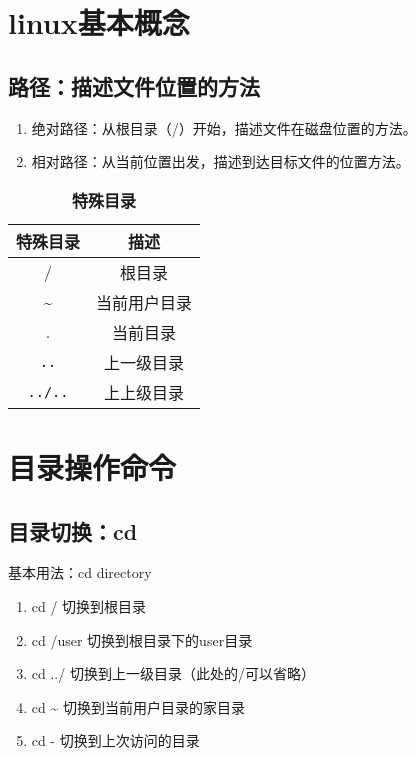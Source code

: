 \documentclass{notebook}
\begin{document}
\maketitle

\newpage
{}
\setcounter{page}{1}
\tableofcontents

\newpage
\setcounter{page}{1}

\chapter{linux基本概念}
\section{路径：描述文件位置的方法}
\begin{enumerate}
    \item 绝对路径：从根目录（/）开始，描述文件在磁盘位置的方法。
    \item 相对路径：从当前位置出发，描述到达目标文件的位置方法。
\end{enumerate}
\begin{table}[htb]
\centering
\caption{\textbf{特殊目录}}
\begin{tabular}{c|c}
\hline
\textbf{特殊目录}&\textbf{描述}\\ 
\hline
/&根目录\\
\~{}&当前用户目录\\
.&当前目录\\
\verb|..|&上一级目录\\
\verb|../..|&上上级目录\\
\hline
\end{tabular}
\end{table}

\chapter{目录操作命令}
\section{目录切换：cd}
基本用法：cd directory
\begin{enumerate}
    \item cd / 切换到根目录
    \item cd /user 切换到根目录下的user目录
    \item cd ../ 切换到上一级目录（此处的/可以省略）
    \item cd \~{} 切换到当前用户目录的家目录
    \item cd - 切换到上次访问的目录
\end{enumerate}
\end{document}
